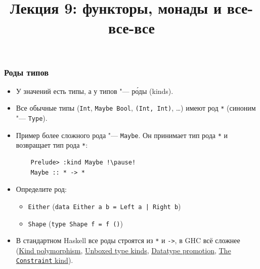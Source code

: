 \documentclass[11pt]{beamer}
\title{Лекция 9: функторы, монады и все-все-все}
\begin{document}
    \begin{frame}[plain]
    \maketitle
\end{frame}

\begin{frame}[fragile]
\frametitle{Роды типов}
\begin{itemize}
    \item У значений есть типы, а у типов "--- р\'{о}ды (kinds).
    \item Все обычные типы (\lstinline|Int|, \lstinline|Maybe Bool|, \lstinline|(Int, Int)|, \ldots) имеют род \lstinline|*| (синоним "--- \lstinline|Type|).
    \pause
    \item Пример более сложного рода "--- \lstinline|Maybe|. Он принимает тип рода \lstinline|*| и возвращает тип рода \lstinline|*|: 
    \begin{lstlisting}
    Prelude> :kind Maybe !\pause!
    Maybe :: * -> *
    \end{lstlisting}
    \pause
    \item Определите род: 
    \begin{itemize}
        \item \lstinline!Either! (\lstinline!data Either a b = Left a | Right b!)
        \pause
        \item \lstinline!Shape! (\lstinline|type Shape f = f ()|)
        \pause
    \end{itemize}
    \item В стандартном Haskell все роды строятся из  \lstinline|*| и \lstinline|->|, в GHC всё сложнее (\href{https://downloads.haskell.org/~ghc/8.6.3/docs/html/users_guide/glasgow_exts.html#kind-polymorphism}{Kind polymorphism}, \href{https://downloads.haskell.org/~ghc/8.6.3/docs/html/users_guide/glasgow_exts.html#unboxed-types-and-primitive-operations}{Unboxed type kinds}, \href{https://downloads.haskell.org/~ghc/8.6.3/docs/html/users_guide/glasgow_exts.html#datatype-promotion}{Datatype promotion},  \href{https://downloads.haskell.org/~ghc/8.6.3/docs/html/users_guide/glasgow_exts.html#the-constraint-kind}{The \lstinline|Constraint| kind}).
\end{itemize}
\end{frame}
\end{document}

